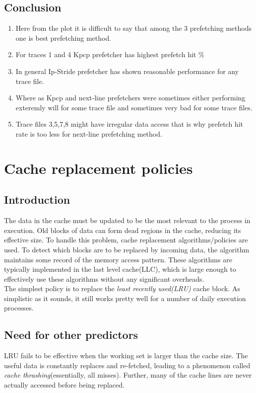 \documentclass[a4paper]{article}
\begin{document}
     \subsection{Conclusion}
      \begin{enumerate}
            \item Here from the plot it is difficult to say that among the 3 prefetching methods one is best prefetching method.
            \item For traces 1 and 4 Kpcp prefetcher has highest prefetch hit \% 
            \item In general Ip-Stride prefetcher has shown reasonable performance for any trace file.
            \item Where as Kpcp  and next-line prefetchers were sometimes either performing exteremly will for some trace file and sometimes very bad for some trace files.
            \item Trace files 3,5,7,8 might have irregular data access that is why prefetch hit rate is too less for next-line prefetching method.
        \end{enumerate}
     
\pagebreak
\section{Cache replacement policies}
    \subsection{Introduction}
        The data in the cache must be updated to be the most relevant to the process in execution. Old blocks of data can form dead regions in the cache, reducing its effective size. To handle this problem, cache replacement algorithms/policies are used. To detect which blocks are to be replaced by incoming data, the algorithm maintains some record of the memory access pattern. These algorithms are typically implemented in the last level cache(LLC), which is large enough to effectively use these algorithms without any significant overheads.\\
    
        The simplest policy is to replace the \textit{least recently used(LRU)} cache block. As simplistic as it sounds, it still works pretty well for a number of daily execution processes.
        
    \subsection{Need for other predictors}
        LRU fails to be effective when the working set is larger than the cache size. The useful data is constantly replaces and re-fetched, leading to a phenomenon called \textit{cache thrashing}(essentially, all misses). Further, many of the cache lines are never actually accessed before being replaced.\\
        
\end{document}
